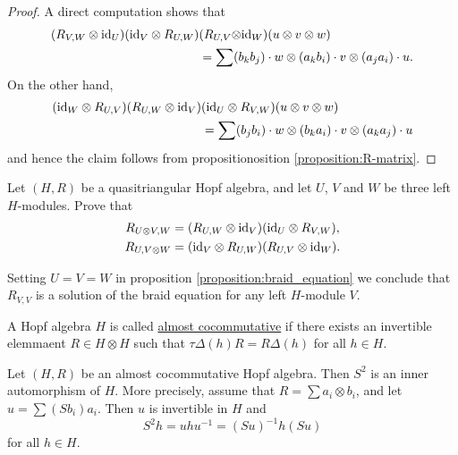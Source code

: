 \begin{proof}
A direct computation shows that
\begin{align*}
(R_{V,W}\otimes\mathrm{id}_{U})(\mathrm{id}_{V}\otimes R_{U,W}) & (R_{U,V}\mathrm{\otimes id}_{W})(u\otimes v\otimes w)\\
 & =\sum(b_{k}b_{j})\cdot w\otimes(a_{k}b_{i})\cdot v\otimes(a_{j}a_{i})\cdot u.
\end{align*}
On the other hand,
\begin{align*}
(\mathrm{id}_{W}\otimes R_{U,V})(R_{U,W}\otimes\mathrm{id}_{V}) & (\mathrm{id}_{U}\otimes R_{V,W})(u\otimes v\otimes w)\\
 & =\sum(b_{j}b_{i})\cdot w\otimes(b_{k}a_{i})\cdot v\otimes(a_{k}a_{j})\cdot u
\end{align*}
and hence the claim follows from propositionosition \ref{proposition:R-matrix}.\end{proof}

\begin{exercise}
\label{exercise:QT_hexagons}
Let $(H,R)$ be a quasitriangular Hopf algebra, and let $U$, $V$ and $W$
be three left $H$-modules. Prove that 
\begin{align}
R_{U\otimes V,W} & =(R_{U,W}\otimes\id_{V})(\id_{U}\otimes R_{V,W}),\label{eq:(Rx1)(1xR)}\\
R_{U,V\otimes W} & =(\id_{V}\otimes R_{U,W})(R_{U,V}\otimes\id_{W}).\label{eq:(1xR)(Rx1)}
\end{align}
\end{exercise}

Setting $U=V=W$ in proposition \ref{proposition:braid_equation} we conclude that
$R_{V,V}$ is a solution of the braid equation for any left $H$-module $V$. 

\begin{definition}
A Hopf algebra $H$ is called \underline{almost cocommutative} if there exists
an invertible elemmaent $R\in H\otimes H$ such that $\tau\Delta(h)R=R\Delta(h)$
for all $h\in H$.
\end{definition}

\begin{proposition}
Let $(H,R)$ be an almost cocommutative Hopf algebra. Then $S^2$ is an inner
automorphism of $H$. More precisely, assume that $R=\sum a_i\otimes b_i$, and
let $u=\sum (Sb_i)a_i$. Then $u$ is invertible in $H$ and
\[
S^2h=uhu^{-1}=(Su)^{-1}h(Su)
\]
for all $h\in H$.
\end{proposition}

